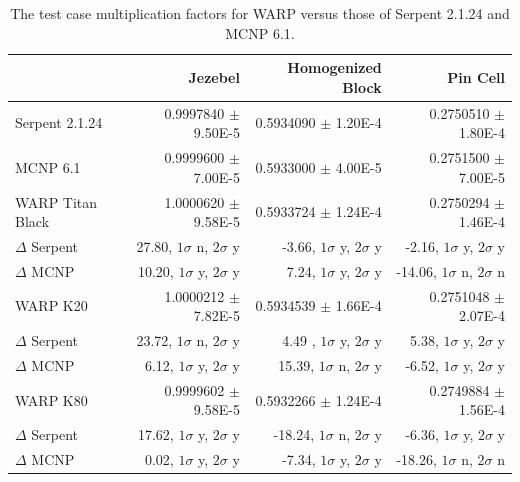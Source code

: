 \documentclass[preprint,12pt]{elsarticle}
\begin{document}
\begin{table}[h]
\centering
\caption{The test case multiplication factors for WARP versus those of Serpent 2.1.24 and MCNP 6.1.}
\label{results_table_keff}
\scriptsize
\begin{tabular}{| l | r | r | r |}
\cline{2-4}
\multicolumn{1}{c|}{}               & Jezebel                         &  Homogenized Block               & Pin Cell                          \\
\hline                          
Serpent 2.1.24                      & 0.9997840 $\pm$ 9.50E-5         & 0.5934090 $\pm$ 1.20E-4          & 0.2750510 $\pm$ 1.80E-4           \\
\hline                          
MCNP 6.1                            & 0.9999600 $\pm$ 7.00E-5         & 0.5933000 $\pm$ 4.00E-5          & 0.2751500 $\pm$ 7.00E-5           \\
\hline                          
WARP Titan Black                    & 1.0000620 $\pm$ 9.58E-5         & 0.5933724 $\pm$ 1.24E-4          & 0.2750294 $\pm$ 1.46E-4           \\
    \qquad\qquad   $\Delta$ Serpent & 27.80, $1\sigma$ n, $2\sigma$ y & -3.66, $1\sigma$ y, $2\sigma$ y  &  -2.16, $1\sigma$ y, $2\sigma$ y  \\
    \qquad\qquad   $\Delta$ MCNP    & 10.20, $1\sigma$ y, $2\sigma$ y &  7.24, $1\sigma$ y, $2\sigma$ y  & -14.06, $1\sigma$ n, $2\sigma$ n  \\
\hline
WARP K20                            & 1.0000212 $\pm$ 7.82E-5         & 0.5934539 $\pm$ 1.66E-4          & 0.2751048 $\pm$ 2.07E-4           \\
    \qquad\qquad   $\Delta$ Serpent & 23.72, $1\sigma$ n, $2\sigma$ y & 4.49 , $1\sigma$ y, $2\sigma$ y  &   5.38, $1\sigma$ y, $2\sigma$ y  \\
    \qquad\qquad   $\Delta$ MCNP    &  6.12, $1\sigma$ y, $2\sigma$ y & 15.39, $1\sigma$ n, $2\sigma$ y  &  -6.52, $1\sigma$ y, $2\sigma$ y  \\
\hline
WARP K80                            & 0.9999602 $\pm$ 9.58E-5         & 0.5932266 $\pm$ 1.24E-4          & 0.2749884 $\pm$ 1.56E-4           \\
    \qquad\qquad   $\Delta$ Serpent & 17.62, $1\sigma$ y, $2\sigma$ y & -18.24, $1\sigma$ n, $2\sigma$ y &  -6.36, $1\sigma$ y, $2\sigma$ y  \\
    \qquad\qquad   $\Delta$ MCNP    &  0.02, $1\sigma$ y, $2\sigma$ y &  -7.34, $1\sigma$ y, $2\sigma$ y & -18.26, $1\sigma$ n, $2\sigma$ n  \\
\hline
\end{tabular}


\end{table}
\end{document}
